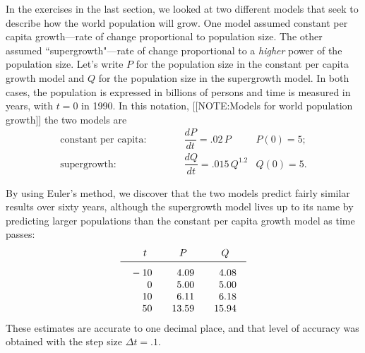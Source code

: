 In the exercises in the last section, we looked at two different
models that seek to describe how the world population will
grow. One model assumed constant per capita
growth---rate of change proportional to population size.  The other
assumed ``supergrowth"---rate of change proportional to a {\em
  higher\/} power of the population size.  Let's write $P$ for the
population size in the constant per capita growth model and $Q$ for
the population size in the supergrowth model.  In both cases, the
population is expressed in billions of persons and time is measured in
years, with $t=0$ in 1990.  In this notation, [[NOTE:Models for world population growth]] the two models are
	\[
\begin{array}{rll}
	\mbox{constant per capita:}  \qquad\quad &
		\dfrac{dP}{dt} =.02\,P
		& P(0) = 5; \\[12pt]
	\mbox{supergrowth:} & 
		\dfrac{dQ}{dt} = .015\,Q^{1.2}  
		& Q(0) = 5. 
	\end{array}
\]

By using Euler's method, we discover that the two models predict
fairly similar results over sixty years, although the supergrowth
model lives up to its name by predicting larger populations than the
constant per capita growth model as time passes:
	\[
\begin{array}{ccc}
	\hphantom{-}t  & P & Q \\ [2pt] \hline
	\begin{array}{r}
	\rule{0pt}{14pt} -10 \\ 0 \\ 10 \\ 50 
	\end{array}
	&
	\begin{array}{r}
	\rule{0pt}{14pt} 4.09 \\ 5.00 \\ 6.11 \\ 13.59 
	\end{array}
	&
	\begin{array}{r}
	\rule{0pt}{14pt} 4.08 \\ 5.00 \\ 6.18 \\ 15.94
	\end{array}
	\end{array}
\]
These estimates are accurate to one decimal place, and that level of
accuracy was obtained with the step size $\Delta t=.1$.

